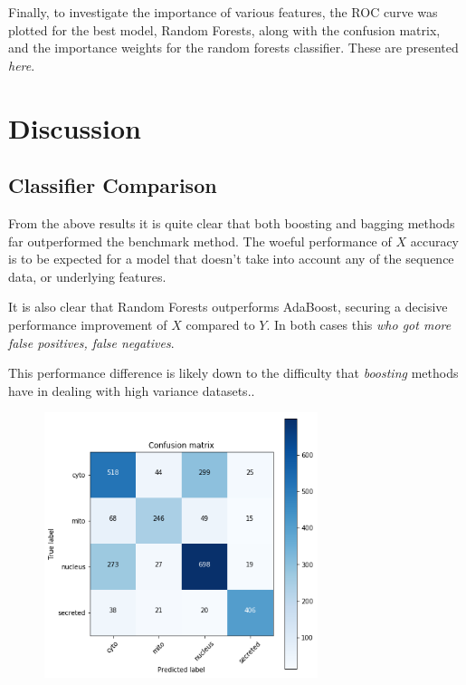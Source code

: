 \documentclass{bioinfo}
\begin{document}
Finally, to investigate the importance of various features, the ROC curve was plotted for the best model, Random Forests, along with the confusion matrix, and the importance weights for the random forests classifier. These are presented \textit{here}.



\section{Discussion}

\subsection{Classifier Comparison}

From the above results it is quite clear that both boosting and bagging methods far outperformed the benchmark method. 
The woeful performance of $X$ accuracy is to be expected for a model that doesn't take into account any of the sequence data, or underlying features. 

It is also clear that Random Forests outperforms AdaBoost, securing a decisive performance improvement of $X$ compared to $Y$. In both cases this \textit{who got more false positives, false negatives}.

This performance difference is likely down to the difficulty that \textit{boosting} methods have in dealing with high variance datasets.. 
\begin{figure}[!h]
\includegraphics[width=8cm]{confusion}
\centering
\end{figure}
\end{document}
